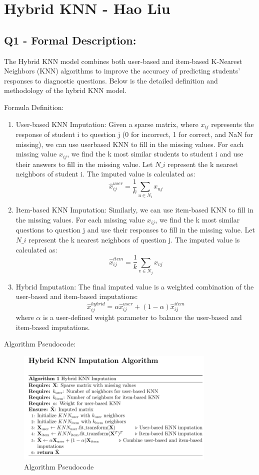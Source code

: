 \documentclass{article}
\begin{document}
\section*{Hybrid KNN - Hao Liu}

\subsection*{Q1 - Formal Description:}
The Hybrid KNN model combines both user-based and item-based K-Nearest Neighbors (KNN) algorithms to improve the accuracy of predicting students' responses to diagnostic questions. Below is the detailed definition and methodology of the hybrid KNN model.

Formula Definition:
\begin{enumerate}
    \item User-based KNN Imputation:\newline
    Given a sparse matrix, where $x_{ij}$ represents the response of student i to question j (0 for incorrect, 1 for correct, and NaN for missing), we can use user\-based KNN to fill in the missing values. For each missing value $x_{ij}$, we find the k most similar students to student i and use their answers to fill in the missing value.
    Let $N\_i$ represent the k nearest neighbors of student i. The imputed value is calculated as:
    \[\hat{x}_{ij}^{user} = \frac{1}{k} \sum_{u \in N_i} x_{uj}\]
    \item Item-based KNN Imputation:\newline
    Similarly, we can use item-based KNN to fill in the missing values. For each missing value $x_{ij}$, we find the k most similar questions to question j and use their responses to fill in the missing value.
    Let $N\_i$ represent the k nearest neighbors of question j. The imputed value is calculated as:
    \[\hat{x}_{ij}^{item} = \frac{1}{k} \sum_{v \in N_j} x_{vj}\]
    \item Hybrid Imputation:\newline
    The final imputed value is a weighted combination of the user-based and item-based imputations:
    \[\hat{x}_{ij}^{hybrid} = \alpha\hat{x}_{ij}^{user} + (1-\alpha)\hat{x}_{ij}^{item}\]
    where $\alpha$ is a user-defined weight parameter to balance the user-based and item-based imputations.
\end{enumerate}
\newpage 

Algorithm Pseudocode:
\begin{figure}[H]
    \centering
    \includegraphics[width=0.85\textwidth]{bl1.png}
    \caption{Algorithm Pseudocode}
\end{figure}
\end{document}
